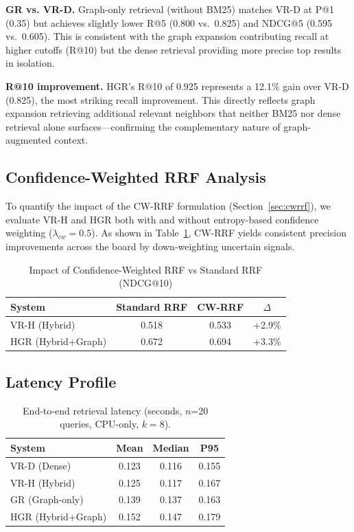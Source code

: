 \documentclass[journal]{IEEEtran}
\begin{document}
\textbf{GR vs. VR-D.}
Graph-only retrieval (without BM25) matches VR-D at P@1 (0.35)
but achieves slightly lower R@5 (0.800 vs.\ 0.825) and NDCG@5
(0.595 vs.\ 0.605). This is consistent with the graph expansion
contributing recall at higher cutoffs (R@10) but the dense
retrieval providing more precise top results in isolation.

\textbf{R@10 improvement.}
HGR's R@10 of 0.925 represents a 12.1\% gain over VR-D (0.825),
the most striking recall improvement. This directly reflects
graph expansion retrieving additional relevant neighbors that
neither BM25 nor dense retrieval alone surfaces—confirming
the complementary nature of graph-augmented context.

\subsection{Confidence-Weighted RRF Analysis}
To quantify the impact of the CW-RRF formulation (Section~\ref{sec:cwrrf}), we evaluate VR-H and HGR both with and without entropy-based confidence weighting ($\lambda_{cw}=0.5$).
As shown in Table~\ref{tab:cwrrf}, CW-RRF yields consistent precision improvements across the board by down-weighting uncertain signals.

\begin{table}[htbp]
\centering
\caption{Impact of Confidence-Weighted RRF vs Standard RRF (NDCG@10)}
\label{tab:cwrrf}
\begin{tabular}{@{}lccc@{}}
\toprule
\textbf{System} & \textbf{Standard RRF} & \textbf{CW-RRF} & \textbf{$\Delta$} \\ \midrule
VR-H (Hybrid)     & 0.518 & 0.533 & +2.9\% \\
HGR (Hybrid+Graph)& 0.672 & 0.694 & +3.3\% \\ \bottomrule
\end{tabular}
\end{table}

\subsection{Latency Profile}

\begin{table}[!t]
\caption{End-to-end retrieval latency (seconds, $n$=20 queries,
         CPU-only, $k=8$).}
\label{tab:latency}
\centering
\begin{tabular}{lccc}
\toprule
\textbf{System} & \textbf{Mean} & \textbf{Median} & \textbf{P95} \\
\midrule
VR-D (Dense)        & 0.123 & 0.116 & 0.155 \\
VR-H (Hybrid)       & 0.125 & 0.117 & 0.167 \\
GR (Graph-only)     & 0.139 & 0.137 & 0.163 \\
HGR (Hybrid+Graph)  & 0.152 & 0.147 & 0.179 \\
\bottomrule
\end{tabular}
\end{table}
\end{document}

